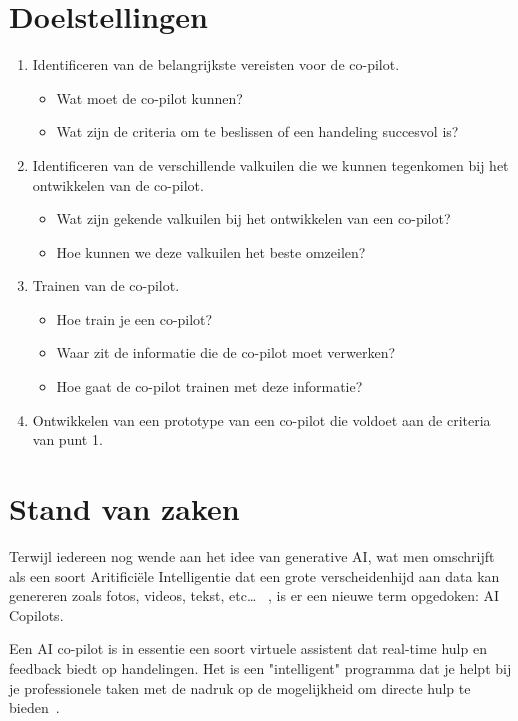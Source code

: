 \documentclass{hogent-article}
\begin{document}
    \section{Doelstellingen}
    \begin{enumerate}
        \item Identificeren van de belangrijkste vereisten voor de co-pilot. 
        \begin{itemize}
            \item Wat moet de co-pilot kunnen?
            \item Wat zijn de criteria om te beslissen of een handeling succesvol is? 
        \end{itemize}
        \item Identificeren van de verschillende valkuilen die we kunnen tegenkomen bij het ontwikkelen van de co-pilot.
        \begin{itemize}
            \item Wat zijn gekende valkuilen bij het ontwikkelen van een co-pilot?
            \item Hoe kunnen we deze valkuilen het beste omzeilen?
        \end{itemize}
        \item Trainen van de co-pilot.
        \begin{itemize}
            \item Hoe train je een co-pilot?
            \item Waar zit de informatie die de co-pilot moet verwerken? 
            \item Hoe gaat de co-pilot trainen met deze informatie?
        \end{itemize}
        \item Ontwikkelen van een prototype van een co-pilot die voldoet aan de criteria van punt 1.
    \end{enumerate}
    
    \section{Stand van zaken}
    Terwijl iedereen nog wende aan het idee van generative AI, wat men omschrijft als een soort Aritificiële Intelligentie dat een grote verscheidenhijd aan data kan genereren zoals fotos, videos, tekst, etc\dots ~\autocite{GenerativeAI2024} , is er een nieuwe term opgedoken: AI Copilots.
    
    Een AI co-pilot is in essentie een soort virtuele assistent dat real-time hulp en feedback biedt op handelingen. Het is een "intelligent" programma dat je helpt bij je professionele taken met de nadruk op de mogelijkheid om directe hulp te bieden~\autocite{SorabGhaswalla2023}.
    
\end{document}
